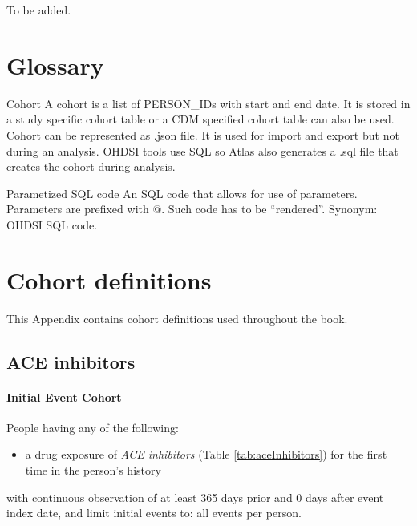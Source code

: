 \documentclass[11pt]{book}
\providecommand{\tightlist}{%
  \setlength{\itemsep}{0pt}\setlength{\parskip}{0pt}}
\theoremstyle{definition}
\theoremstyle{definition}
\theoremstyle{definition}
\theoremstyle{remark}
\begin{document}
To be added.

\hypertarget{appendix-appendix}{%
\appendix {}}


\hypertarget{Glossary}{%
\chapter{Glossary}\label{Glossary}}

Cohort
A cohort is a list of PERSON\_IDs with start and end date. It is stored in a study specific cohort table or a CDM specified cohort table can also be used. Cohort can be represented as .json file. It is used for import and export but not during an analysis. OHDSI tools use SQL so Atlas also generates a .sql file that creates the cohort during analysis.

Parametized SQL code
An SQL code that allows for use of parameters. Parameters are prefixed with @. Such code has to be ``rendered''. Synonym: OHDSI SQL code.

\hypertarget{CohortDefinitions}{%
\chapter{Cohort definitions}\label{CohortDefinitions}}

This Appendix contains cohort definitions used throughout the book.

\hypertarget{AceInhibitors}{%
\section{ACE inhibitors}\label{AceInhibitors}}

\hypertarget{initial-event-cohort}{%
\subsubsection*{Initial Event Cohort}\label{initial-event-cohort}}

People having any of the following:

\begin{itemize}
\tightlist
\item
  a drug exposure of \emph{ACE inhibitors} (Table \ref{tab:aceInhibitors}) for the first time in the person's history
\end{itemize}

with continuous observation of at least 365 days prior and 0 days after event index date, and limit initial events to: all events per person.
\end{document}
